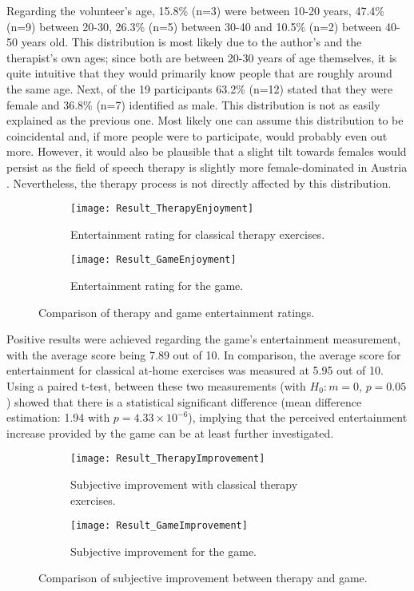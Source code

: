 \documentclass[draft,final]{vutinfth} %
\begin{document}
Regarding the volunteer's age, 15.8\% (n=3) were between 10-20 years, 47.4\% (n=9) between 20-30, 26.3\% (n=5) between 30-40 and 10.5\% (n=2) between 40-50 years old. This distribution is most likely due to the author's and the therapist's own ages; since both are between 20-30 years of age themselves, it is quite intuitive that they would primarily know people that are roughly around the same age. Next, of the 19 participants 63.2\% (n=12) stated that they were female and 36.8\% (n=7) identified as male. This distribution is not as easily explained as the previous one. Most likely one can assume this distribution to be coincidental and, if more people were to participate, would probably even out more. However, it would also be plausible that a slight tilt towards females would persist as the field of speech therapy is slightly more female-dominated in Austria \cite{LogopedicStatistic}. Nevertheless, the therapy process is not directly affected by this distribution.

\begin{figure}
\begin{subfigure}{.9\textwidth}
  \centering
  \texttt{[image: Result\_TherapyEnjoyment]}
  \caption{Entertainment rating for classical therapy exercises.}
\end{subfigure}
\begin{subfigure}{.9\textwidth}
  \centering
  \texttt{[image: Result\_GameEnjoyment]}
  \caption{Entertainment rating for the game.}
\end{subfigure}
\caption{Comparison of therapy and game entertainment ratings.}
\end{figure}

Positive results were achieved regarding the game's entertainment measurement, with the average score being 7.89 out of 10. In comparison, the average score for entertainment for classical at-home exercises was measured at 5.95 out of 10.  Using a paired t-test, between these two measurements (with $H_0: m=0$, $p=0.05$) showed that there is a statistical significant difference (mean difference estimation: 1.94 with $p=4.33 \times 10^{-6}$), implying that the perceived entertainment increase provided by the game can be at least further investigated.\\

\begin{figure}
\begin{subfigure}{.9\textwidth}
  \centering
  \texttt{[image: Result\_TherapyImprovement]}
  \caption{Subjective improvement with classical therapy exercises.}
\end{subfigure}
\begin{subfigure}{.9\textwidth}
  \centering
  \texttt{[image: Result\_GameImprovement]}
  \caption{Subjective improvement for the game.}
\end{subfigure}
\caption{Comparison of subjective improvement between therapy and game.}
\end{figure}
\end{document}
